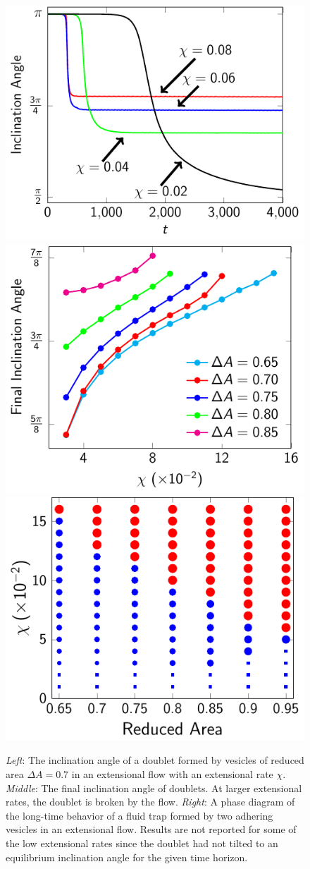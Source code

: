 \documentclass[prf,superscriptaddress,showkeys]{revtex4-1}
\begin{document}
\begin{figure}[htp]
  \includegraphics[height=0.26\textwidth]{figs/adR4em1adS7em1_ra070_inclinationAngle.pdf}
  \includegraphics[height=0.26\textwidth]{figs/adR4em1adS7em1_finalInclinationAngle.pdf}
  \includegraphics[height=0.26\textwidth]{figs/extensional_adR4em1adS7em1_phaseDiagram.pdf}
  \caption{\label{fig:extensionalInclinationAngle} {\em Left}: The
  inclination angle of a doublet formed by vesicles of reduced area
  $\Delta A = 0.7$ in an extensional flow with an extensional rate
  $\chi$.  {\em Middle}: The final inclination angle of doublets.  At
  larger extensional rates, the doublet is broken by the flow.  {\em
  Right}: A phase diagram of the long-time behavior of a fluid trap
  formed by two adhering vesicles in an extensional flow.  Results are
  not reported for some of the low extensional rates since the doublet
  had not tilted to an equilibrium inclination angle for the given time
  horizon.}
\end{figure}
\end{document}
